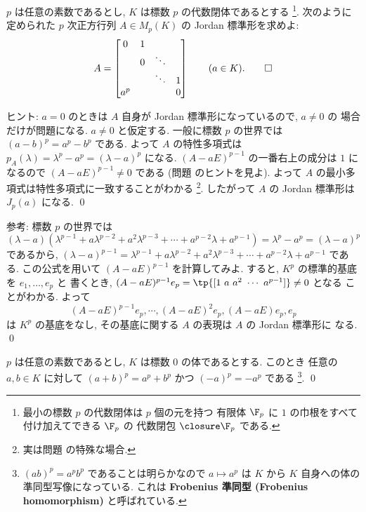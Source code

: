 \documentclass[12pt,twoside]{jarticle}
\begin{document}
\begin{question}
  $p$ は任意の素数であるとし, $K$ は標数 $p$ の代数閉体であるとする%
  \footnote{最小の標数 $p$ の代数閉体は $p$ 個の元を持つ
    有限体 $\F_p$ に $1$ の巾根をすべて付け加えてできる $\F_p$ の
    代数閉包 $\closure\F_p$ である.}.
  次のように定められた $p$ 次正方行列 $A\in M_p(K)$ の Jordan 標準形を求めよ:
  \begin{equation*}
    A = 
    \begin{bmatrix}
      0   & 1 &        & \\
          & 0 & \ddots & \\
          &   & \ddots & 1 \\
      a^p &   &        & 0 \\
    \end{bmatrix}
    \qquad (a\in K).
    \qed
  \end{equation*}
\end{question}

\noindent
ヒント: $a=0$ のときは $A$ 自身が Jordan 標準形になっているので, $a\ne 0$ の
場合だけが問題になる.  $a\ne 0$ と仮定する.
一般に標数 $p$ の世界では $(a-b)^p=a^p-b^p$ である.
よって $A$ の特性多項式は $p_A(\lambda)=\lambda^p-a^p=(\lambda-a)^p$ になる.
$(A-aE)^{p-1}$ の一番右上の成分は $1$ になるので $(A-aE)^{p-1}\ne 0$ である
(問題  のヒントを見よ).
よって $A$ の最小多項式は特性多項式に一致することがわかる%
\footnote{実は問題  の特殊な場合.}.
したがって $A$ の Jordan 標準形は $J_p(a)$ になる.
\qed

\medskip
\noindent
参考: 標数 $p$ の世界では $(\lambda-a)
(\lambda^{p-1}+a\lambda^{p-2}+a^2\lambda^{p-3}+\cdots+a^{p-2}\lambda+a^{p-1})
=\lambda^p-a^p=(\lambda-a)^p$ であるから, $(\lambda-a)^{p-1}
=\lambda^{p-1}+a\lambda^{p-2}+a^2\lambda^{p-3}+\cdots+a^{p-2}\lambda+a^{p-1}$ 
である. この公式を用いて $(A-aE)^{p-1}$ を計算してみよ.
すると, $K^p$ の標準的基底を $e_1,\dots,e_p$ と
書くとき, $(A-aE)^{p-1}e_p = \tp{[1\ a\ a^2\ \cdots\ a^{p-1}]}\ne 0$ となる
ことがわかる.  よって 
\begin{equation*}
  (A-aE)^{p-1}e_p,\cdots,(A-aE)^2e_p,(A-aE)e_p,e_p
\end{equation*}
は $K^p$ の基底をなし, その基底に関する $A$ の表現は $A$ の Jordan 標準形に
なる.
\qed


\begin{question}
\label{q:Frobenius-homomorphism}
  $p$ は任意の素数であるとし, $K$ は標数 $0$ の体であるとする. このとき
  任意の $a,b\in K$ に対して $(a+b)^p=a^p+b^p$ かつ $(-a)^p=-a^p$ である%
  \footnote{$(ab)^p=a^pb^p$ であることは明らかなので $a\mapsto a^p$ は $K$ 
    から $K$ 自身への体の準同型写像になっている.  
    これは {\bf Frobenius 準同型 (Frobenius homomorphism)} と呼ばれている.}.
  \qed
\end{question}
\end{document}
